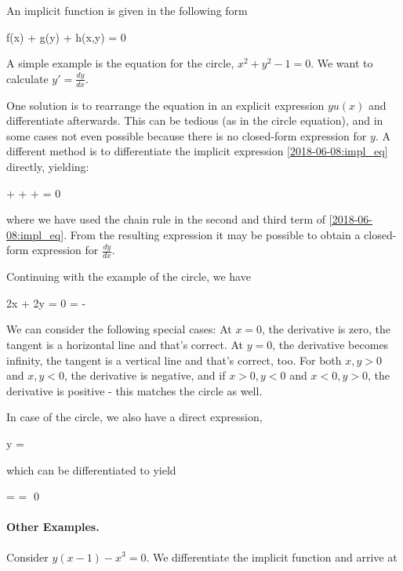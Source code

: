 
An implicit function is given in the following form

\be\label{2018-06-08:impl_eq}
f(x) + g(y) + h(x,y) = 0
\ee

A simple example is the equation for the circle, $x^2 + y^2 - 1 = 0$. We want to calculate $y' = \frac{dy}{dx}$.

One solution is to rearrange the equation in an explicit expression $y u(x)$ and differentiate afterwards. This can be tedious (as in the circle equation), and in some cases not even possible because there is no closed-form expression for $y$. A different method is to differentiate the implicit expression \eqref{2018-06-08:impl_eq} directly, yielding:

\bee
{} +   +  +  = 0
\eee

where we have used the chain rule in the second and third term of \eqref{2018-06-08:impl_eq}. From the resulting expression it may be possible to obtain a closed-form expression for $\frac{dy}{dx}$.

Continuing with the example of the circle, we have

\bee
2x + 2y  = 0 \rightarrow {} = -
\eee

We can consider the following special cases: At $x=0$, the derivative is zero, the tangent is a horizontal line and that's correct. At $y=0$, the derivative becomes infinity, the tangent is a vertical line and that's correct, too. For both $x,y > 0$ and $x,y<0$, the derivative is negative, and if $x>0, y<0$ and $x<0, y>0$, the derivative is positive - this matches the circle as well.

In case of the circle, we also have a direct expression,

\bee
y = \pm {}
\eee

which can be differentiated to yield

\bee
{} = \pm {} = \pm {} \qed
\eee

\paragraph{Other Examples.} Consider $y(x-1) - x^3 = 0$. We differentiate the implicit function and arrive at

